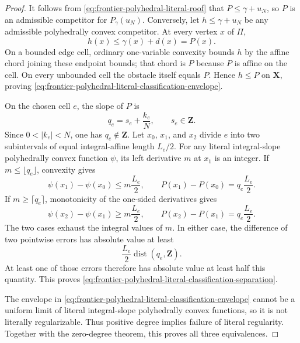 \begin{proof}
It follows from
\eqref{eq:frontier-polyhedral-literal-roof} that
$P\leq\gamma+u_N$, so $P$ is an admissible competitor for
$P_\gamma(u_N)$.  Conversely, let $h\leq\gamma+u_N$ be any admissible
polyhedrally convex competitor.  At every vertex $x$ of $\Pi$,
\[
                         h(x)\leq\gamma(x)+d(x)=P(x).
\]
On a bounded edge cell, ordinary one-variable convexity bounds $h$ by the
affine chord joining these endpoint bounds; that chord is $P$ because $P$
is affine on the cell.  On every unbounded cell the obstacle itself equals
$P$.  Hence $h\leq P$ on $\mathbf X$, proving
\eqref{eq:frontier-polyhedral-literal-classification-envelope}.

On the chosen cell $e$, the slope of $P$ is
\[
                         q_e=s_e+\frac{k_e}{N},
 \qquad s_e\in\mathbf Z.
\]
Since $0<|k_e|<N$, one has $q_e\notin\mathbf Z$.  Let $x_0$, $x_1$, and
$x_2$ divide $e$ into two subintervals of equal integral-affine length
$L_e/2$.  For any literal integral-slope polyhedrally convex function
$\psi$, its left derivative $m$ at $x_1$ is an integer.  If
$m\leq\lfloor q_e\rfloor$, convexity gives
\[
 \psi(x_1)-\psi(x_0)\leq m\frac{L_e}{2},
 \qquad
 P(x_1)-P(x_0)=q_e\frac{L_e}{2}.
\]
If $m\geq\lceil q_e\rceil$, monotonicity of the one-sided derivatives gives
\[
 \psi(x_2)-\psi(x_1)\geq m\frac{L_e}{2},
 \qquad
 P(x_2)-P(x_1)=q_e\frac{L_e}{2}.
\]
The two cases exhaust the integral values of $m$.  In either case, the
difference of two pointwise errors has absolute value at least
\[
              \frac{L_e}{2}\operatorname{dist}(q_e,\mathbf Z).
\]
At least one of those errors therefore has absolute value at least half
this quantity.  This proves
\eqref{eq:frontier-polyhedral-literal-classification-separation}.

The envelope in
\eqref{eq:frontier-polyhedral-literal-classification-envelope} cannot be a
uniform limit of literal integral-slope polyhedrally convex functions, so
it is not literally regularizable.  Thus positive degree implies failure
of literal regularity.  Together with the zero-degree theorem, this proves
all three equivalences.
\end{proof}
